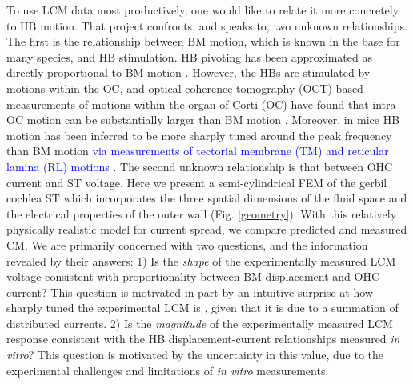 \documentclass{biophys-new}
\begin{document}
\par{To use LCM data most productively, one would like to relate it more concretely to HB motion.  That project confronts, and speaks to, two unknown relationships. The first is the relationship between BM motion, which is known in the base for many species, and HB stimulation. HB pivoting has been approximated as directly proportional to BM motion \cite{dallos3}. However, the HBs are stimulated by motions within the OC, and optical coherence tomography (OCT) based measurements of motions within the organ of Corti (OC) have found that intra-OC motion can be substantially larger than BM motion \cite{renpnas2016,cooper,fallah,strimbu,chen_2011}.  Moreover, in mice HB motion has been inferred to be more sharply tuned around the peak frequency than BM motion \textcolor{blue}{via measurements of tectorial membrane (TM) and reticular lamina (RL) motions} \cite{lee}. The second unknown relationship is that between OHC current and ST voltage. Here we present a semi-cylindrical FEM of the gerbil cochlea ST which incorporates the three spatial dimensions of the fluid space and the electrical properties of the outer wall (Fig. \ref{geometry}). With this relatively physically realistic model for current spread, we compare predicted and measured CM. We are primarily concerned with two questions, and the information revealed by their answers: 1) Is the \textit{shape} of the experimentally measured LCM voltage consistent with proportionality between BM displacement and OHC current?  This question is motivated in part by an intuitive surprise at how sharply tuned the experimental LCM is \cite{dongolson,fridberger,fallah,wang}, given that it is due to a summation of distributed currents. 2) Is the \textit{magnitude} of the experimentally measured LCM response consistent with the HB displacement-current relationships measured \textit{in vitro}?  This question is motivated by the uncertainty in this value, due to the experimental challenges and limitations of \textit{in vitro} measurements. }  
\end{document}
